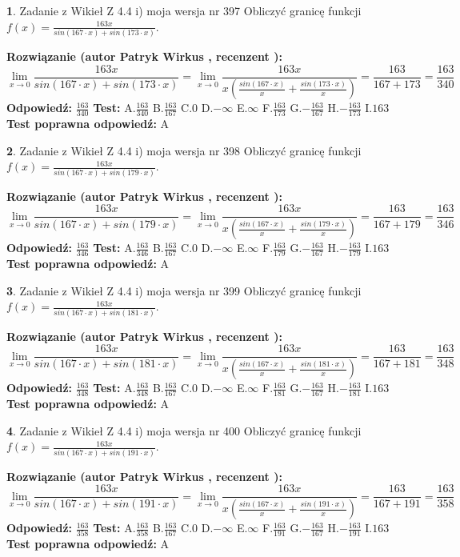 \documentclass[12pt, a4paper]{article}
\theoremstyle{definition} %
\newtheorem{zad}{}
\newcommand{\zadStart}[1]{\begin{zad}#1\newline}
\newcommand{\zadStop}{\end{zad}}
\newcommand{\rozwStart}[2]{\noindent \textbf{Rozwiązanie (autor #1 , recenzent #2): }\newline}
\newcommand{\rozwStop}{\newline}
\newcommand{\odpStart}{\noindent \textbf{Odpowiedź:}\newline}
\newcommand{\odpStop}{\newline}
\newcommand{\testStart}{\noindent \textbf{Test:}\newline}
\newcommand{\testStop}{\newline}
\newcommand{\kluczStart}{\noindent \textbf{Test poprawna odpowiedź:}\newline}
\newcommand{\kluczStop}{\newline}
\begin{document}
\zadStart{Zadanie z Wikieł Z 4.4 i) moja wersja nr 397}
Obliczyć granicę funkcji $f(x)=\frac{163x}{sin(167\cdot x) +sin(173\cdot x)}$.
\zadStop
\rozwStart{Patryk Wirkus}{}
$$\lim\limits_{x\to 0}\frac{163x}{sin(167\cdot x) +sin(173\cdot x)}=\lim\limits_{x\to 0}\frac{163x}{x(\frac{sin(167\cdot x)}{x}+\frac{sin(173\cdot x)}{x})}=\frac{163}{167+173} = \frac{163}{340}$$
\rozwStop
\odpStart
$\frac{163}{340}$
\odpStop
\testStart
A.$\frac{163}{340}$
B.$\frac{163}{167}$
C.$0$
D.$-\infty$
E.$\infty$
F.$\frac{163}{173}$
G.$-\frac{163}{167}$
H.$-\frac{163}{173}$
I.$163$
\testStop
\kluczStart
A
\kluczStop



\zadStart{Zadanie z Wikieł Z 4.4 i) moja wersja nr 398}
Obliczyć granicę funkcji $f(x)=\frac{163x}{sin(167\cdot x) +sin(179\cdot x)}$.
\zadStop
\rozwStart{Patryk Wirkus}{}
$$\lim\limits_{x\to 0}\frac{163x}{sin(167\cdot x) +sin(179\cdot x)}=\lim\limits_{x\to 0}\frac{163x}{x(\frac{sin(167\cdot x)}{x}+\frac{sin(179\cdot x)}{x})}=\frac{163}{167+179} = \frac{163}{346}$$
\rozwStop
\odpStart
$\frac{163}{346}$
\odpStop
\testStart
A.$\frac{163}{346}$
B.$\frac{163}{167}$
C.$0$
D.$-\infty$
E.$\infty$
F.$\frac{163}{179}$
G.$-\frac{163}{167}$
H.$-\frac{163}{179}$
I.$163$
\testStop
\kluczStart
A
\kluczStop



\zadStart{Zadanie z Wikieł Z 4.4 i) moja wersja nr 399}
Obliczyć granicę funkcji $f(x)=\frac{163x}{sin(167\cdot x) +sin(181\cdot x)}$.
\zadStop
\rozwStart{Patryk Wirkus}{}
$$\lim\limits_{x\to 0}\frac{163x}{sin(167\cdot x) +sin(181\cdot x)}=\lim\limits_{x\to 0}\frac{163x}{x(\frac{sin(167\cdot x)}{x}+\frac{sin(181\cdot x)}{x})}=\frac{163}{167+181} = \frac{163}{348}$$
\rozwStop
\odpStart
$\frac{163}{348}$
\odpStop
\testStart
A.$\frac{163}{348}$
B.$\frac{163}{167}$
C.$0$
D.$-\infty$
E.$\infty$
F.$\frac{163}{181}$
G.$-\frac{163}{167}$
H.$-\frac{163}{181}$
I.$163$
\testStop
\kluczStart
A
\kluczStop



\zadStart{Zadanie z Wikieł Z 4.4 i) moja wersja nr 400}
Obliczyć granicę funkcji $f(x)=\frac{163x}{sin(167\cdot x) +sin(191\cdot x)}$.
\zadStop
\rozwStart{Patryk Wirkus}{}
$$\lim\limits_{x\to 0}\frac{163x}{sin(167\cdot x) +sin(191\cdot x)}=\lim\limits_{x\to 0}\frac{163x}{x(\frac{sin(167\cdot x)}{x}+\frac{sin(191\cdot x)}{x})}=\frac{163}{167+191} = \frac{163}{358}$$
\rozwStop
\odpStart
$\frac{163}{358}$
\odpStop
\testStart
A.$\frac{163}{358}$
B.$\frac{163}{167}$
C.$0$
D.$-\infty$
E.$\infty$
F.$\frac{163}{191}$
G.$-\frac{163}{167}$
H.$-\frac{163}{191}$
I.$163$
\testStop
\kluczStart
A
\kluczStop
\end{document}
